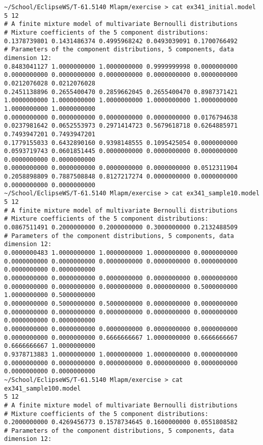 \documentclass[a4paper,oneside,article]{memoir}
\begin{document}
\begin{lstlisting}
~/School/EclipseWS/T-61.5140 Mlapm/exercise > cat ex341_initial.model
5 12
# A finite mixture model of multivariate Bernoulli distributions
# Mixture coefficients of the 5 component distributions:
0.1378739801 0.1431486374 0.4995968242 0.0493039091 0.1700766492 
# Parameters of the component distributions, 5 components, data dimension 12:
0.8483041127 1.0000000000 1.0000000000 0.9999999998 0.0000000000 0.0000000000 0.0000000000 0.0000000000 0.0000000000 0.0000000000 0.0212076028 0.0212076028 
0.2451138896 0.2655400470 0.2859662045 0.2655400470 0.8987371421 1.0000000000 1.0000000000 1.0000000000 1.0000000000 1.0000000000 1.0000000000 1.0000000000 
0.0000000000 0.0000000000 0.0000000000 0.0000000000 0.0176794638 0.0237981642 0.0652553973 0.2971414723 0.5679618718 0.6264885971 0.7493947201 0.7493947201 
0.1779155033 0.6432890160 0.9398148555 0.1095425054 0.0000000000 0.0593719743 0.0601851445 0.0000000000 0.0000000000 0.0000000000 0.0000000000 0.0000000000 
0.0000000000 0.0000000000 0.0000000000 0.0000000000 0.0512311904 0.2058898809 0.7887508848 0.8127217274 0.0000000000 0.0000000000 0.0000000000 0.0000000000 
~/School/EclipseWS/T-61.5140 Mlapm/exercise > cat ex341_sample10.model 
5 12
# A finite mixture model of multivariate Bernoulli distributions
# Mixture coefficients of the 5 component distributions:
0.0867511491 0.2000000000 0.2000000000 0.3000000000 0.2132488509 
# Parameters of the component distributions, 5 components, data dimension 12:
0.0000000483 1.0000000000 1.0000000000 1.0000000000 0.0000000000 0.0000000000 0.0000000000 0.0000000000 0.0000000000 0.0000000000 0.0000000000 0.0000000000 
0.0000000000 0.0000000000 0.0000000000 0.0000000000 0.0000000000 0.0000000000 0.0000000000 0.0000000000 0.0000000000 0.5000000000 1.0000000000 0.5000000000 
0.0000000000 0.5000000000 0.5000000000 0.0000000000 0.0000000000 0.0000000000 0.0000000000 0.0000000000 0.0000000000 0.0000000000 0.0000000000 0.0000000000 
0.0000000000 0.0000000000 0.0000000000 0.0000000000 0.0000000000 0.0000000000 0.0000000000 0.6666666667 1.0000000000 0.6666666667 0.6666666667 1.0000000000 
0.9378713883 1.0000000000 1.0000000000 1.0000000000 0.0000000000 0.0000000000 0.0000000000 0.0000000000 0.0000000000 0.0000000000 0.0000000000 0.0000000000 
~/School/EclipseWS/T-61.5140 Mlapm/exercise > cat ex341_sample100.model 
5 12
# A finite mixture model of multivariate Bernoulli distributions
# Mixture coefficients of the 5 component distributions:
0.2000000000 0.4269456773 0.1578734645 0.1600000000 0.0551808582 
# Parameters of the component distributions, 5 components, data dimension 12:

\end{lstlisting}
\end{document}
